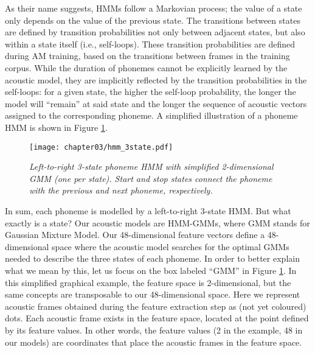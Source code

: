 As their name suggests, HMMs follow a Markovian process; the value of a state only depends on the value of the previous state. The transitions between states are defined by transition probabilities not only between adjacent states, but also within a state itself (i.e., self-loops). These transition probabilities are defined during AM training, based on the transitions between frames in the training corpus. While the duration of phonemes cannot be explicitly learned by the acoustic model, they are implicitly reflected by the transition probabilities in the self-loops: for a given state, the higher the self-loop probability, the longer the model will ``remain'' at said state and the longer the sequence of acoustic vectors assigned to the corresponding phoneme. A simplified illustration of a phoneme HMM is shown in Figure \ref{fig:hmm_3state}.

\begin{figure}[htb]
\centering
\texttt{[image: chapter03/hmm\_3state.pdf]}
\caption{\textit{Left-to-right 3-state phoneme HMM with simplified 2-dimensional GMM (one per state). Start and stop states connect the phoneme with the previous and next phoneme, respectively.}}
\label{fig:hmm_3state}
\end{figure}

In sum, each phoneme is modelled by a left-to-right 3-state HMM. But what exactly is a state? Our acoustic models are HMM-GMMs, where GMM stands for Gaussian Mixture Model. Our 48-dimensional feature vectors define a 48-dimensional space where the acoustic model searches for the optimal GMMs needed to describe the three states of each phoneme. In order to better explain what we mean by this, let us focus on the box labeled ``GMM'' in Figure \ref{fig:hmm_3state}. In this simplified graphical example, the feature space is 2-dimensional, but the same concepts are transposable to our 48-dimensional space.
Here we represent acoustic frames obtained during the feature extraction step as (not yet coloured) dots. Each acoustic frame exists in the feature space, located at the point defined by its feature values. In other words, the feature values (2 in the example, 48 in our models) are coordinates that place the acoustic frames in the feature space.

